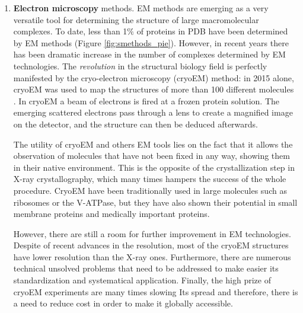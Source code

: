 \documentclass[12pt, a4paper,twoside]{tesi_upf}
\begin{document}
\begin{enumerate}[label=(\alph*)]
\item \textbf{Electron microscopy} methods. EM methods are emerging as a very versatile tool for determining the structure of large macromolecular complexes. To date, less than 1$\%$ of proteins in PDB have been determined by EM methods (Figure \ref{fig:smethods_pie}). However, in recent years there has been dramatic increase in the number of complexes determined by EM technologies. The \textit{revolution} in the structural biology field is perfectly manifested by the cryo-electron microscopy (cryoEM) method: in 2015 alone, cryoEM was used to map the structures of more than 100 different molecules \cite{CryoEM}. In cryoEM a beam of electrons is fired at a frozen protein solution. The
emerging scattered electrons pass through a lens to create a magnified image on the detector, and the structure can then be deduced afterwards. 
\par The utility of cryoEM and others EM tools lies on the fact that it allows the observation of molecules that have not been fixed in any way, showing them in their native environment. This is the opposite of the crystallization step in X-ray crystallography, which many times hampers the success of the whole procedure. CryoEM have been traditionally used in large molecules such as ribosomes\cite{Khatter2015} or the V-ATPase\cite{Zhao2015}, but they have also shown their potential in small membrane proteins\cite{Liao2013} and medically important proteins\cite{Bai2015}. 
\par However, there are still a room for further improvement in EM technologies. Despite of recent advances in the resolution, most of the cryoEM structures have lower resolution than the X-ray ones. Furthermore, there are numerous technical unsolved problems that need to be addressed to make easier its standardization and systematical application. Finally, the high prize of cryoEM experiments are many times  slowing Its spread and therefore, there is a need to reduce cost in order to make it globally accessible. %
\end{enumerate}
 
\end{document}
